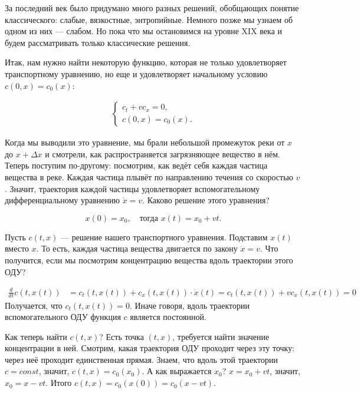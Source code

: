За последний век было придумано много разных решений, обобщающих понятие классического: слабые, вязкостные, энтропийные. Немного позже мы узнаем об одном из них --- слабом. Но пока что мы остановимся на уровне XIX века и будем рассматривать только классические решения.

Итак, нам нужно найти некоторую функцию, которая не только удовлетворяет транспортному уравнению, но еще и удовлетворяет начальному условию $ c (0, x) = c_0 (x) $:

\begin{align}
    \begin{cases} 
        c_t + v c_x = 0, \\
        c (0, x) = c_0 (x).
    \end{cases}
\label{transport}
\end{align}

Когда мы выводили это уравнение, мы брали небольшой промежуток реки от $x$ до $ x + \Delta x $ и смотрели, как распространяется загрязняющее вещество в нём. Теперь поступим по-другому: посмотрим, как ведёт себя каждая частица вещества в реке. Каждая частица плывёт по направлению течения со скоростью $v$. Значит, траектория каждой частицы удовлетворяет вспомогательному дифференциальному уравнению $ \dot x = v $. Каково решение этого уравнения?

\[
	x(0) = x_0,\quad \text{тогда } x(t) = x_0 + v t .
\]


Пусть $ c (t, x) $ --- решение нашего транспортного уравнения. Подставим $ x(t) $ вместо $x$. То есть, каждая частица вещества двигается по закону $ \dot x = v $. Что получится, если мы посмотрим концентрацию вещества вдоль траектории этого ОДУ?

\begin{align*}
    \frac {d} {dt} c (t, x(t)) & = c_t (t, x(t)) + c_x (t, x(t)) \cdot \dot x (t) = c_t (t, x(t)) + v c_x (t, x(t)) = 0
\end{align*}
Получается, что $ c_t (t, x(t)) = 0 $. Иначе говоря, вдоль траектории вспомогательного ОДУ функция $c$ является постоянной.

Как теперь найти $ c (t,x) $? Есть точка $ (t, x) $, требуется найти значение концентрации в ней. Смотрим, какая траектория ОДУ проходит через эту точку: через неё проходит единственная прямая. Знаем, что вдоль этой траектории $ c = const $, значит, $ c (t, x) = c_0 (x_0) $. А как выражается $ x_0 $? $ x = x_0 + v t $, значит, $ x_0 = x - vt $.
Итого $c(t,x) = c_0(x(0)) = c_0(x-vt)$.

